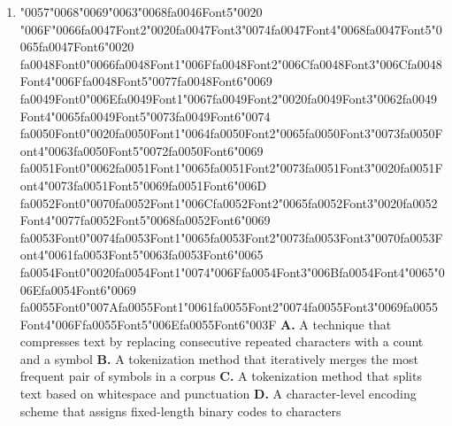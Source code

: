 \documentclass[11pt]{article}
\begin{document}
\begin{enumerate}[leftmargin=*]
  \item {\char"0057}{\char"0068}{\char"0069}{\char"0063}{\char"0068}{\csname fa0046Font5\endcsname\char"0020} {\char"006F}{\char"0066}{\csname fa0047Font2\endcsname\char"0020}{\csname fa0047Font3\endcsname\char"0074}{\csname fa0047Font4\endcsname\char"0068}{\csname fa0047Font5\endcsname\char"0065}{\csname fa0047Font6\endcsname\char"0020} {\csname fa0048Font0\endcsname\char"0066}{\csname fa0048Font1\endcsname\char"006F}{\csname fa0048Font2\endcsname\char"006C}{\csname fa0048Font3\endcsname\char"006C}{\csname fa0048Font4\endcsname\char"006F}{\csname fa0048Font5\endcsname\char"0077}{\csname fa0048Font6\endcsname\char"0069} {\csname fa0049Font0\endcsname\char"006E}{\csname fa0049Font1\endcsname\char"0067}{\csname fa0049Font2\endcsname\char"0020}{\csname fa0049Font3\endcsname\char"0062}{\csname fa0049Font4\endcsname\char"0065}{\csname fa0049Font5\endcsname\char"0073}{\csname fa0049Font6\endcsname\char"0074} {\csname fa0050Font0\endcsname\char"0020}{\csname fa0050Font1\endcsname\char"0064}{\csname fa0050Font2\endcsname\char"0065}{\csname fa0050Font3\endcsname\char"0073}{\csname fa0050Font4\endcsname\char"0063}{\csname fa0050Font5\endcsname\char"0072}{\csname fa0050Font6\endcsname\char"0069} {\csname fa0051Font0\endcsname\char"0062}{\csname fa0051Font1\endcsname\char"0065}{\csname fa0051Font2\endcsname\char"0073}{\csname fa0051Font3\endcsname\char"0020}{\csname fa0051Font4\endcsname\char"0073}{\csname fa0051Font5\endcsname\char"0069}{\csname fa0051Font6\endcsname\char"006D} {\csname fa0052Font0\endcsname\char"0070}{\csname fa0052Font1\endcsname\char"006C}{\csname fa0052Font2\endcsname\char"0065}{\csname fa0052Font3\endcsname\char"0020}{\csname fa0052Font4\endcsname\char"0077}{\csname fa0052Font5\endcsname\char"0068}{\csname fa0052Font6\endcsname\char"0069} {\csname fa0053Font0\endcsname\char"0074}{\csname fa0053Font1\endcsname\char"0065}{\csname fa0053Font2\endcsname\char"0073}{\csname fa0053Font3\endcsname\char"0070}{\csname fa0053Font4\endcsname\char"0061}{\csname fa0053Font5\endcsname\char"0063}{\csname fa0053Font6\endcsname\char"0065} {\csname fa0054Font0\endcsname\char"0020}{\csname fa0054Font1\endcsname\char"0074}{\char"006F}{\csname fa0054Font3\endcsname\char"006B}{\csname fa0054Font4\endcsname\char"0065}{\char"006E}{\csname fa0054Font6\endcsname\char"0069} {\csname fa0055Font0\endcsname\char"007A}{\csname fa0055Font1\endcsname\char"0061}{\csname fa0055Font2\endcsname\char"0074}{\csname fa0055Font3\endcsname\char"0069}{\csname fa0055Font4\endcsname\char"006F}{\csname fa0055Font5\endcsname\char"006E}{\csname fa0055Font6\endcsname\char"003F}
    \textbf{A.} A technique that compresses text by replacing consecutive repeated characters with a count and a symbol
    \textbf{B.} A tokenization method that iteratively merges the most frequent pair of symbols in a corpus
    \textbf{C.} A tokenization method that splits text based on whitespace and punctuation
    \textbf{D.} A character-level encoding scheme that assigns fixed-length binary codes to characters


\end{enumerate}
\end{document}
